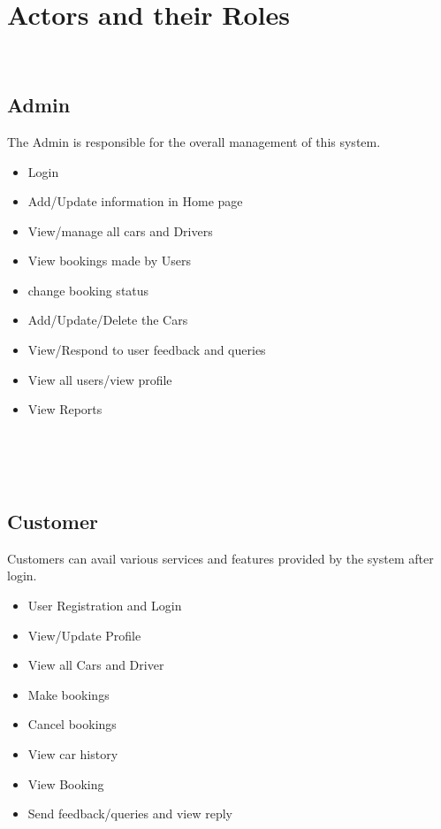 \documentclass[a4paper,12pt,toc=flat]{report}
\begin{document}
	\section{Actors and their Roles}{
	\\
	\subsection{Admin}{
	The Admin is responsible for the overall management of this system.
	 \begin{itemize}
	\item Login
  \item Add/Update information in Home page
  \item View/manage all cars and Drivers
  \item View bookings made by Users 
  \item change booking status
 \item 	Add/Update/Delete the Cars 
 \item View/Respond to user feedback and queries
 \item View all users/view profile
  \item View Reports 
	\end{itemize}
	}
	\\
	 
	\\
	\\ \vspace*{11pt}
	
	\hspace*{-16pt} 
	\subsection{Customer}{
	    \hspace*{2pt} Customers can avail various services and features provided by the system after login.
	\begin{itemize}
	\item User Registration and Login
  	\item View/Update Profile
  	\item View all Cars and Driver
	\item Make bookings
	\item Cancel bookings
 	\item View car history
	\item View Booking
	\item Send feedback/queries and view reply

		
	\end{itemize}
	}
	
}
\end{document}
